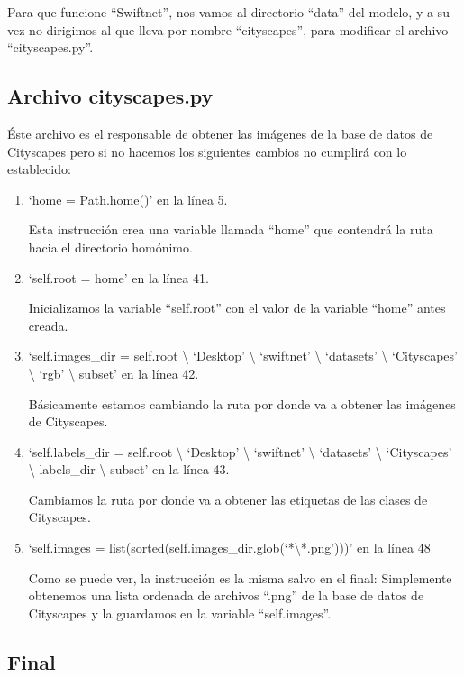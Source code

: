 Para que funcione ``Swiftnet'', nos vamos al directorio ``data'' del modelo, y a su vez no dirigimos al que lleva por nombre ``cityscapes'', para modificar el archivo ``cityscapes.py''.

\subsection{Archivo cityscapes.py}

Éste archivo es el responsable de obtener las imágenes de la base de datos de Cityscapes pero si no hacemos los siguientes cambios no cumplirá con lo establecido:

\begin{enumerate}
\item `home = Path.home()' en la línea 5.

Esta instrucción crea una variable llamada ``home'' que contendrá la ruta hacia el directorio homónimo.

\item `self.root = home' en la línea 41.

Inicializamos la variable ``self.root'' con el valor de la variable ``home'' antes creada.

\item `self.images\_dir = self.root \textbackslash{} `Desktop' \textbackslash{} `swiftnet' \textbackslash{} `datasets' \textbackslash{} `Cityscapes' \textbackslash{} `rgb' \textbackslash{} subset' en la línea 42.

Básicamente estamos cambiando la ruta por donde va a obtener las imágenes de Cityscapes.

\item `self.labels\_dir = self.root \textbackslash{} `Desktop' \textbackslash{} `swiftnet' \textbackslash{} `datasets' \textbackslash{} `Cityscapes' \textbackslash{} labels\_dir \textbackslash{} subset' en la línea 43.

Cambiamos la ruta por donde va a obtener las etiquetas de las clases de Cityscapes.

\item `self.images = list(sorted(self.images\_dir.glob(`*\textbackslash{*.png}')))' en la línea 48

Como se puede ver, la instrucción es la misma salvo en el final: Simplemente obtenemos una lista ordenada de archivos ``.png'' de la base de datos de Cityscapes y la guardamos en la variable ``self.images''.
\end{enumerate}

\subsection{Final}

